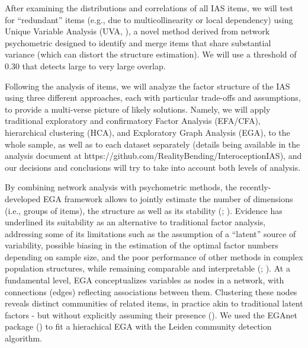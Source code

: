 \documentclass[
  jou,
  floatsintext,
  longtable,
  nolmodern,
  notxfonts,
  notimes,
  colorlinks=true,linkcolor=blue,citecolor=blue,urlcolor=blue]{apa7}
\begin{document}
After examining the distributions and correlations of all IAS items, we
will test for ``redundant'' items (e.g., due to multicollinearity or
local dependency) using Unique Variable Analysis (UVA,
), a novel
method derived from network psychometric designed to identify and merge
items that share substantial variance (which can distort the structure
estimation). We will use a threshold of 0.30 that detects large to very
large overlap.

Following the analysis of items, we will analyze the factor structure of
the IAS using three different approaches, each with particular
trade-offs and assumptions, to provide a multi-verse picture of likely
solutions. Namely, we will apply traditional exploratory and
confirmatory Factor Analysis (EFA/CFA), hierarchical clustering (HCA),
and Exploratory Graph Analysis (EGA), to the whole sample, as well as to
each dataset separately (details being available in the analysis
document at https://github.com/RealityBending/InteroceptionIAS), and our
decisions and conclusions will try to take into account both levels of
analysis.

By combining network analysis with psychometric methods, the
recently-developed EGA framework allows to jointly estimate the number
of dimensions (i.e., groups of items), the structure as well as its
stability (; ). Evidence has underlined its suitability as an alternative to
traditional factor analysis, addressing some of its limitations such as
the assumption of a ``latent'' source of variability, possible biasing
in the estimation of the optimal factor numbers depending on sample
size, and the poor performance of other methods in complex population
structures, while remaining comparable and interpretable
(; ).
At a fundamental level, EGA conceptualizes variables as nodes in a
network, with connections (edges) reflecting associations between them.
Clustering these nodes reveals distinct communities of related items, in
practice akin to traditional latent factors - but without explicitly
assuming their presence
(). We used the EGAnet package
()
to fit a hierachical EGA with the Leiden community detection algorithm.
\end{document}
